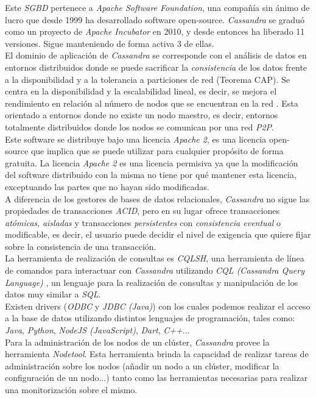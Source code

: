 \documentclass{article}
\begin{document}
Este \emph{SGBD} pertenece a \emph{Apache Software Foundation}, una compañía sin ánimo de lucro que desde 1999 ha desarrollado software open-source. \emph{Cassandra} se graduó como un proyecto de \emph{Apache Incubator} en 2010, y desde entonces ha liberado 11 versiones. Sigue manteniendo de forma activa 3 de ellas. \cite{AP:5} \\

El dominio de aplicación de \emph{Cassandra} se corresponde con el análisis de datos en entornos distribuidos donde se puede sacrificar la \emph{consistencia} de los datos frente a la disponibilidad y a la tolerancia a particiones de red (Teorema CAP). Se centra en la disponibilidad y la escalabilidad lineal, es decir, se mejora el rendimiento en relación al número de nodos que se encuentran en la red \cite{WIKI:5}. Esta orientado a entornos donde no existe un nodo maestro, es decir, entornos totalmente distribuidos donde los nodos se comunican por una red \emph{P2P}.\\

Este software se distribuye bajo una licencia \emph{Apache 2}, es una licencia open-source que implica que se puede utilizar para cualquier propósito de forma gratuita. La licencia \emph{Apache 2} es una licencia permisiva ya que la modificación del software distribuido con la misma no tiene por qué mantener esta licencia, exceptuando las partes que no hayan sido modificadas. \cite{WIKI:6}\\

A diferencia de los gestores de bases de datos relacionales, \emph{Cassandra} no sigue las propiedades de transacciones \emph{ACID}, pero en su lugar ofrece transacciones \emph{atómicas}, \emph{aisladas} y transacciones \emph{persistentes} con \emph{consistencia eventual} o modificable, es decir, el usuario puede decidir el nivel de exigencia que quiere fijar sobre la consistencia de una transacción. \cite{DS:1} \\

La herramienta de realización de consultas es \emph{CQLSH}, una herramienta de línea de comandos para interactuar con \emph{Cassandra} utilizando \emph{CQL (Cassandra Query Language)} \cite{AP:3}, un lenguaje para la realización de consultas y manipulación de los datos muy similar a \emph{SQL}. \cite{WIKI:5} \\
Existen drivers (\emph{ODBC} y \emph{JDBC (Java)}) con los cuales podemos realizar el acceso a la base de datos utilizando distintos lenguajes de programación, tales como: \emph{Java}, \emph{Python}, \emph{NodeJS (JavaScript)}, \emph{Dart}, \emph{C++}... \cite{AP:4} \\
Para la administración de los nodos de un clúster, \emph{Cassandra} provee la herramienta \emph{Nodetool}. Esta herramienta brinda la capacidad de realizar tareas de administración sobre los nodos (añadir un nodo a un clúster, modificar la configuración de un nodo...) tanto como las herramientas necesarias para realizar una monitorización sobre el mismo. \cite{WIKI:5} \\
\end{document}
